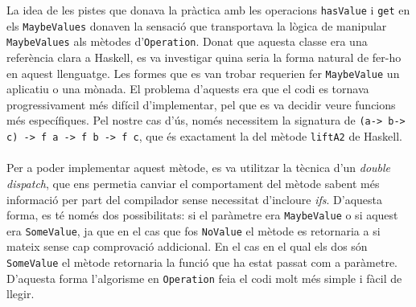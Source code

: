 
	La idea de les pistes que donava la pràctica amb les operacions 
	\texttt{hasValue} i \texttt{get} en els \texttt{MaybeValues} 
	donaven la sensació que transportava la lògica de manipular \texttt{MaybeValues} als mètodes d'\texttt{Operation}.
	Donat que aquesta classe era una referència clara a Haskell, es va investigar quina seria la forma natural de fer-ho
	en aquest llenguatge. Les formes que es van trobar requerien fer \texttt{MaybeValue} un aplicatiu o una mònada. 
	El problema
	d'aquests era que el codi es tornava progressivament més difícil d'implementar, pel que es va decidir veure
	funcions més específiques. Pel nostre cas d'ús, només necessitem la signatura de 
	\texttt{(a-> b-> c) -> f a -> f b -> f c}, que és exactament la del mètode \texttt{liftA2} de Haskell.\\
	\\
	Per a poder implementar aquest mètode, es va utilitzar la tècnica d'un \textit{double dispatch}, 
	que ens permetia canviar
	el comportament del mètode sabent més informació per part del compilador sense necessitat d'incloure \textit{ifs}.
	D'aquesta forma, es té només dos possibilitats: si el paràmetre era \texttt{MaybeValue} o si aquest era 
	\texttt{SomeValue}, ja que en el cas que fos \texttt{NoValue} el 
	mètode es retornaria a si mateix sense cap comprovació
	addicional. En el cas en el qual els dos són \texttt{SomeValue} el
	 mètode retornaria la funció que ha estat passat com a 
	paràmetre. D'aquesta forma l'algorisme en \texttt{Operation} 
	feia el codi molt més simple i fàcil de llegir.
